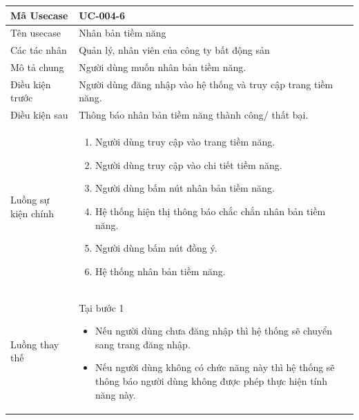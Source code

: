 \documentclass[12pt,a4paper]{article}
\begin{document}
    \begin{table}[H]
        \centering
        \begin{tabular}{|p{3.5cm}|p{11.5cm}|c|}
            \hline
            Mã Usecase      & UC-004-6                                                       \\
            \hline
            Tên usecase     & Nhân bản tiềm năng                                             \\
            \hline
            Các tác nhân    & Quản lý, nhân viên của công ty bất động sản                    \\
            \hline
            Mô tả chung     & Người dùng muốn nhân bản tiềm năng.                            \\
            \hline
            Điều kiện trước & Người dùng đăng nhập vào hệ thống và truy cập trang tiềm năng. \\
            \hline
            Điều kiện sau   & Thông báo nhân bản tiềm năng thành công/ thất bại.             \\
            \hline
            Luồng sự kiện chính & \vspace{-.8cm}\begin{enumerate}
                                                    \item Người dùng truy cập vào trang tiềm năng.
                                                    \item Người dùng truy cập vào chi tiết tiềm năng.
                                                    \item  Người dùng bấm nút nhân bản tiềm năng.
                                                    \item  Hệ thống hiện thị thông báo chắc chắn nhân bản tiềm năng.
                                                    \item  Người dùng bấm nút đồng ý.
                                                    \item Hệ thống nhân bản tiềm năng.
            \end{enumerate}
            \\
            \hline
            Luồng thay thế & Tại bước 1\newline
            \vspace{-.8cm}\begin{itemize}
                              \item Nếu người dùng chưa đăng nhập thì hệ thống sẽ chuyển sang trang đăng nhập.
                              \item Nếu người dùng không có chức năng này thì hệ thống sẽ thông báo người dùng không được phép thực hiện tính năng này.
            \end{itemize}


\end{tabular}
\end{table}
\end{document}
